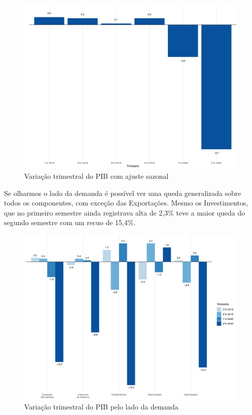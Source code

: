 \begin{figure}[ht]
	\caption{Variação trimestral do PIB com ajuste sazonal}
	\includegraphics[width=\linewidth]{fig/pib_total.pdf}
\end{figure}
\par Se olharmos o lado da demanda é possível ver uma queda generalizada sobre todos os componentes, com exceção das Exportações. Mesmo os Investimentos, que no primeiro semestre ainda registrava alta de 2,3\% teve a maior queda do segundo semestre com um recuo de 15,4\%.
\begin{figure}[ht]
	\caption{Variação trimestral do PIB pelo lado da demanda}
	\includegraphics[width=\linewidth]{fig/pib_demanda.pdf}
\end{figure}
